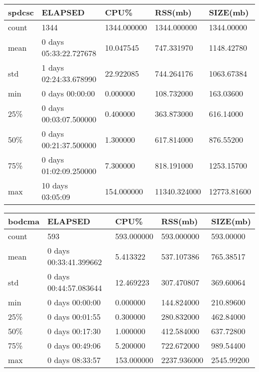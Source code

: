 \documentclass{article}
\begin{document}
\begin{table}[H]
\begin{tabular}{|l|l|l|l|l|}
\hline spdcsc& ELAPSED&    CPU\%&   RSS(mb)&  SIZE(mb) \\
\hline count&   1344& 1344.000000&  1344.000000&  1344.00000 \\
\hline mean&  0 days 05:33:22.727678&  10.047545&  747.331970&  1148.42780 \\
\hline std&  1 days 02:24:33.678990&  22.922085&  744.264176&  1063.67384 \\
\hline min&   0 days 00:00:00&   0.000000&  108.732000&  163.03600 \\
\hline 25\%&  0 days 00:03:07.500000&   0.400000&  363.873000&  616.14000 \\
\hline 50\%&  0 days 00:21:37.500000&   1.300000&  617.814000&  876.55200 \\
\hline 75\%&  0 days 01:02:09.250000&   7.300000&  818.191000&  1253.15700 \\
\hline max&  10 days 03:05:09&  154.000000& 11340.324000& 12773.81600 \\
\hline 
\end{tabular}
\label{TABLE-SessionSizespdcsc}
\end{table}

\begin{table}[H]
\begin{tabular}{|l|l|l|l|l|}
\hline bodcma& ELAPSED&   CPU\%&  RSS(mb)&   SIZE(mb) \\
\hline count&    593& 593.000000&  593.000000&  593.00000 \\
\hline mean&  0 days 00:33:41.399662&  5.413322&  537.107386&  765.38517 \\
\hline std&  0 days 00:44:57.083644&  12.469223&  307.470807&  369.60064 \\
\hline min&   0 days 00:00:00&  0.000000&  144.824000&  210.89600 \\
\hline 25\%&   0 days 00:01:55&  0.300000&  280.832000&  462.84000 \\
\hline 50\%&   0 days 00:17:30&  1.000000&  412.584000&  637.72800 \\
\hline 75\%&   0 days 00:49:06&  5.200000&  722.672000&  989.54400 \\
\hline max&   0 days 08:33:57& 153.000000& 2237.936000& 2545.99200 \\
\hline 
\end{tabular}
\label{TABLE-SessionSizebodcma}
\end{table}
\end{document}
